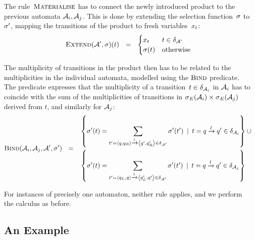 The rule~$\textsc{Materialise}$ has to connect the newly introduced
product to the previous automata
$\mathcal{A}_i, \mathcal{A}_j$. This is done by extending the
selection function~$\operatorname{\sigma}$ to $\operatorname{\sigma}'$, mapping the transitions of the product
to fresh variables~$x_{t}$:
\begin{equation*}
  \textsc{Extend}(\mathcal{A}',\sigma)(t)
  ~~=~~
  \begin{cases}
    x_{t} & t \in \delta_{\mathcal{A}'}
    \\
    \operatorname{\sigma}(t) & \text{otherwise}
  \end{cases}
\end{equation*}

The multiplicity of transitions in the product then has to be related
to the multiplicities in the individual automata, modelled using the
$\textsc{Bind}$ predicate. The predicate expresses that the multiplicity
of a transition~$t \in \delta_{\mathcal{A}_i}$ in
$\mathcal{A}_i$ has to coincide with the sum of the multiplicities of
transitions in $\operatorname{\sigma}_{E}(\mathcal{A}_i) \times \operatorname{\sigma}_{E}(\mathcal{A}_j)$ derived from $t$,
and similarly for $\mathcal{A}_j$:
%
  $$
  \textsc{Bind}(\mathcal{A}_i, \mathcal{A}_j, \mathcal{A}', \operatorname{\sigma}') ~~=~~
  \begin{aligned}
  & \left\{ 
    \operatorname{\sigma}'(t)  =  \sum\limits_{t' = \left\langle q, q_R\right\rangle \xrightarrow{l} \left\langle q', q'_R\right\rangle \in \delta_{\mathcal{A}'}} \operatorname{\sigma}'(t')
  \:\mid\: t = q \xrightarrow{l} q' \in \delta_{\mathcal{A}_i} \right\} \cup\mbox{} \\ 
  & \left\{
    \operatorname{\sigma}'(t)  =  \sum\limits_{t' = \left\langle q_L, q\right\rangle \xrightarrow{l} \left\langle q'_L, q'\right\rangle \in \delta_{\mathcal{A}'}} \operatorname{\sigma}'(t') \:\mid\: t = q \xrightarrow{l} q' \in \delta_{\mathcal{A}_j}
  \right\}
  \end{aligned}
$$

For instances of precisely one automaton, neither rule applies, and we perform
the calculus as before.

\subsection{An Example}\label{sec:multiple:example}


